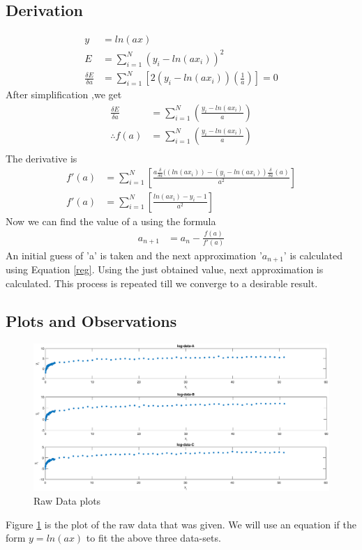 \documentclass{article}
\begin{document}
\subsection{Derivation}
\begin{align}
y &= ln(ax) \\
E &= \sum\limits_{i = 1}^N (y_i - ln(ax_i))^2 \\
\frac{\delta E}{\delta a} &= \sum\limits_{i = 1}^N [ 2(y_i - ln(ax_i)) (\frac{1}{a})] = 0 
\end{align}
After simplification ,we get  \\
\begin{align}
\frac{\delta E}{\delta a} &= \sum\limits_{i=1}^N (\frac{y_i - ln(ax_i)}{a}) \\
\therefore f(a) &=  \sum\limits_{i=1}^N (\frac{y_i - ln(ax_i)}{a}) \\
\end{align}
The derivative is 
\begin{align}
f'(a) &= \sum\limits_{i=1}^N [ \frac{a\frac{\delta}{\delta a}((ln(ax_i)) - (y_i - ln(ax_i))\frac{\delta}{\delta a}(a) }{ a^2 } ] \\
f'(a) &= \sum\limits_{i=1}^N [ \frac{ln(ax_i) - y_i - 1}{ a^2}]
\end{align}
Now we can find the value of a using the formula
\begin{align}
a_{n+1} &= a_n - \frac{f(a)}{f'(a)} 
\label{reg}
\end{align}
An initial guess of  'a' is taken and the next approximation '$a_{n+1}$'  is calculated using Equation \ref{reg}. Using the just obtained value, next approximation is calculated. This process is repeated till we converge to a desirable result.

\subsection{Plots and Observations}

\begin{figure}[h]
\centering
	\includegraphics[width=\textwidth]{raw_data.eps}
	\caption{Raw Data plots}
	\label{fig:raw}
\end{figure}
\noindent
Figure \ref{fig:raw} is the plot of the raw data that was given.  We will use an equation if the form $y = ln(ax)$ to fit the above three data-sets.  \\
\end{document}
